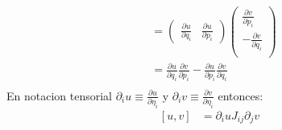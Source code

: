 \documentclass[a4paper]{article}
\begin{document}
\begin{answer}[punto 21]
\begin{align*}
            &= \begin{pmatrix}
                \frac{\partial u}{\partial q_i} &
                \frac{\partial u}{\partial p_i}
            \end{pmatrix}
            \begin{pmatrix}
                \frac{\partial v}{\partial p_i} \\
                -\frac{\partial v}{\partial q_i} \\
            \end{pmatrix}\\
            &= \frac{\partial u}{\partial q_i} \frac{\partial v}{\partial p_i} - \frac{\partial u}{\partial p_i} \frac{\partial v}{\partial q_i}\\
        \end{align*}
        En notacion tensorial $\partial_i u \equiv \frac{\partial u}{\partial \eta_i}$ y $\partial_i v \equiv \frac{\partial v}{\partial \eta_i}$ entonces:
        \begin{align*}
            \left[u,v\right] &= \partial_i u J_{ij} \partial_j v\\
        \end{align*}


\end{answer}
\end{document}
